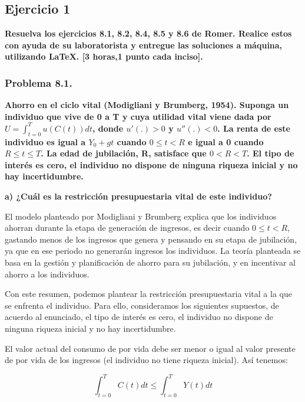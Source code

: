 \documentclass[
]{article}
\begin{document}
\hypertarget{ejercicio-1}{%
\subsection{Ejercicio 1}\label{ejercicio-1}}

\textbf{Resuelva los ejercicios 8.1, 8.2, 8.4, 8.5 y 8.6 de Romer.
Realice estos con ayuda de su laboratorista y entregue las soluciones a
máquina, utilizando LaTeX. {[}3 horas,1 punto cada inciso{]}.}

\hypertarget{problema-8.1.}{%
\subsubsection{Problema 8.1.}\label{problema-8.1.}}

\textbf{Ahorro en el ciclo vital (Modigliani y Brumberg, 1954). Suponga
un individuo que vive de 0 a T y cuya utilidad vital viene dada por
\(U = \int_{t=0}^{T} u(C(t))dt\), donde \(u'(.)>0\) y \(u''(.)<0\). La
renta de este individuo es igual a \(Y_0 + gt\) cuando \(0\leq t<R\) e
igual a 0 cuando \(R\leq t \leq T\). La edad de jubilación, R, satisface
que \(0<R<T\). El tipo de interés es cero, el individuo no dispone de
ninguna riqueza inicial y no hay incertidumbre.}

\textbf{a) ¿Cuál es la restricción presupuestaria vital de este
individuo?}

El modelo planteado por Modigliani y Brumberg explica que los individuos
ahorran durante la etapa de generación de ingresos, es decir cuando
\(0\leq t<R\), gastando menos de los ingresos que genera y pensando en
su etapa de jubilación, ya que en ese periodo no generarán ingresos los
individuos. La teoría planteada se basa en la gestión y planificación de
ahorro para su jubilación, y en incentivar al ahorro a los individuos.

Con este resumen, podemos plantear la restricción presupuestaria vital a
la que se enfrenta el individuo. Para ello, consideramos los siguientes
supuestos, de acuerdo al enunciado, el tipo de interés es cero, el
individuo no dispone de ninguna riqueza inicial y no hay incertidumbre.

El valor actual del consumo de por vida debe ser menor o igual al valor
presente de por vida de los ingresos (el individuo no tiene riqueza
inicial). Así tenemos:

\setcounter{equation}{0}

\begin{equation}
\int_{t=0}^{T} C(t)dt\leqslant\int_{t=0}^{T}Y(t)dt
\end{equation}
\end{document}
